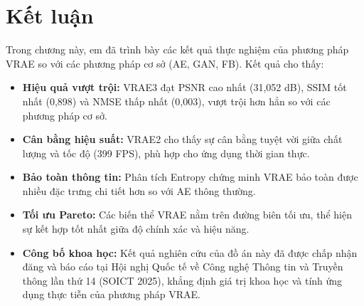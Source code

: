 \section{Kết luận}

Trong chương này, em đã trình bày các kết quả thực nghiệm của phương pháp VRAE so với các phương pháp cơ sở (AE, GAN, FB). Kết quả cho thấy:

\begin{itemize}
    \item \textbf{Hiệu quả vượt trội:} VRAE3 đạt PSNR cao nhất (31,052 dB), SSIM tốt nhất (0,898) và NMSE thấp nhất (0,003), vượt trội hơn hẳn so với các phương pháp cơ sở.
    \item \textbf{Cân bằng hiệu suất:} VRAE2 cho thấy sự cân bằng tuyệt vời giữa chất lượng và tốc độ (399 FPS), phù hợp cho ứng dụng thời gian thực.
    \item \textbf{Bảo toàn thông tin:} Phân tích Entropy chứng minh VRAE bảo toàn được nhiều đặc trưng chi tiết hơn so với AE thông thường.
    \item \textbf{Tối ưu Pareto:} Các biến thể VRAE nằm trên đường biên tối ưu, thể hiện sự kết hợp tốt nhất giữa độ chính xác và hiệu năng.
    \item \textbf{Công bố khoa học:} Kết quả nghiên cứu của đồ án này đã được chấp nhận đăng và báo cáo tại Hội nghị Quốc tế về Công nghệ Thông tin và Truyền thông lần thứ 14 (SOICT 2025), khẳng định giá trị khoa học và tính ứng dụng thực tiễn của phương pháp VRAE.
\end{itemize}

